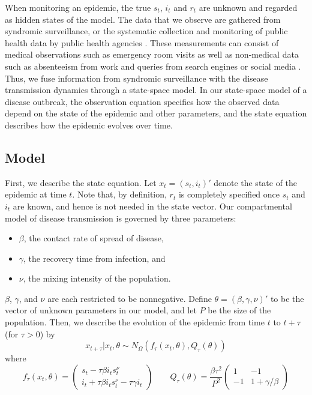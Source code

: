 \documentclass{elsarticle}
\begin{document}
When monitoring an epidemic, the true $s_t$, $i_t$ and $r_t$ are unknown and regarded as hidden states of the model. The data that we observe are gathered from syndromic surveillance, or the systematic collection and monitoring of public health data by public health agencies \citep{wagner2006biosurveillance, wilson2006synsurveillance}. These measurements can consist of medical observations such as emergency room visits as well as non-medical data such as absenteeism from work and queries from search engines or social media \citep{chew2010twitter, schuster2010searchquery, signorini2011twitter, Gins:Mohe:Pate:Bram:Smol:Bril:dete:2009}. Thus, we fuse information from syndromic surveillance with the disease transmission dynamics through a state-space model. In our state-space model of a disease outbreak, the observation equation specifies how the observed data depend on the state of the epidemic and other parameters, and the state equation describes how the epidemic evolves over time.

\subsection{Model \label{sec:model}}

First, we describe the state equation. Let $x_t = (s_t,i_t)'$ denote the state of the epidemic at time $t$. Note that, by definition, $r_t$ is completely specified once $s_t$ and $i_t$ are known, and hence is not needed in the state vector. Our compartmental model of disease transmission is governed by three parameters:

\begin{itemize}
\item $\beta$, the contact rate of spread of disease,
\item $\gamma$, the recovery time from infection, and
\item $\nu$, the mixing intensity of the population.
\end{itemize}

\noindent $\beta$, $\gamma$, and $\nu$ are each restricted to be nonnegative. Define $\theta = (\beta,\gamma,\nu)'$ to be the vector of unknown parameters in our model, and let $P$ be the size of the population. Then, we describe the evolution of the epidemic from time $t$ to $t + \tau$ (for $\tau > 0$) by
\begin{equation}
x_{t+\tau}\left|x_t,\theta\right. \sim N_\Omega\left(f_\tau(x_t,\theta),Q_{\tau}(\theta)\right) \label{eqn:state}
\end{equation}
\noindent where
\[
f_\tau(x_t,\theta) = \left(
\begin{array}{c}
s_t - \tau\beta i_ts^{\nu}_t \phantom{- \tau\gamma i_t}\,\, \\
i_t +  \tau\beta i_ts^\nu_t - \tau\gamma i_t
\end{array}
\right)
\qquad
Q_\tau(\theta) = \frac{\beta \tau^2}{P^2} \left(
\begin{array}{ccccc}
1 & -1 \\
-1 & 1 + \gamma/\beta
\end{array}
\right)
\]
\end{document}
